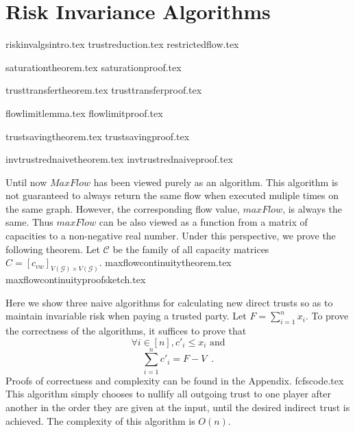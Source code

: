 \section{Risk Invariance Algorithms}
  {riskinvalgsintro.tex}
  {trustreduction.tex}
  {restrictedflow.tex}

  {saturationtheorem.tex}
  {saturationproof.tex}

  {trusttransfertheorem.tex}
  {trusttransferproof.tex}

  {flowlimitlemma.tex}
  {flowlimitproof.tex}

  {trustsavingtheorem.tex}
  {trustsavingproof.tex}

  {invtrustrednaivetheorem.tex}
  {invtrustrednaiveproof.tex}

  Until now $MaxFlow$ has been viewed purely as an algorithm. This algorithm is not guaranteed to always return the same
  flow when executed muliple times on the same graph. However, the corresponding flow value, $maxFlow$, is always the same.
  Thus $maxFlow$ can be also viewed as a function from a matrix of capacities to a non-negative real number. Under this
  perspective, we prove the following theorem. Let $\mathcal{C}$ be the family of all capacity matrices
  $C = [c_{vw}]_{V\left(\mathcal{G}\right) \times V\left(\mathcal{G}\right)}$.
  {maxflowcontinuitytheorem.tex}
  {maxflowcontinuityproofsketch.tex}

  Here we show three naive algorithms for calculating new direct trusts so as to maintain invariable risk when paying
  a trusted party. Let $F = \sum\limits_{i=1}^{n}x_i$. To prove the correctness of the algorithms, it suffices to prove that
  \begin{equation}
  \label{naive:req1}
     \forall i \in [n], c'_i \leq x_i \mbox{ and}
  \end{equation}
  \begin{equation}
  \label{naive:req2}
     \sum\limits_{i=1}^{n}c'_i = F - V \enspace.
  \end{equation}
  Proofs of correctness and complexity can be found in the Appendix.
  {fcfscode.tex}
  This algorithm simply chooses to nullify all outgoing trust to one player after another in the order they are given at the
  input, until the desired indirect trust is achieved. The complexity of this algorithm is $O\left(n\right)$.

